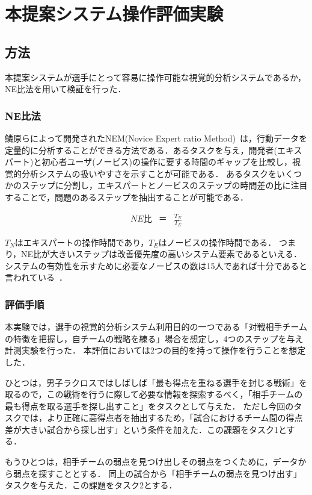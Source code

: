 \documentclass[sotsuron]{kuee}
\begin{document}
	\section{本提案システム操作評価実験}
		\subsection{方法}
			本提案システムが選手にとって容易に操作可能な視覚的分析システムであるか，NE比法を用いて検証を行った．
				\subsubsection{NE比法}
					鱗原らによって開発されたNEM(Novice Expert ratio Method)~\cite{NEM}は，行動データを定量的に分析することができる方法である．あるタスクを与え，開発者(エキスパート)と初心者ユーザ(ノービス)の操作に要する時間のギャップを比較し，視覚的分析システムの扱いやすさを示すことが可能である．
					あるタスクをいくつかのステップに分割し，エキスパートとノービスのステップの時間差の比に注目することで，問題のあるステップを抽出することが可能である．

					\begin{eqnarray}
						NE比 & ＝ & \frac{T_N}{T_E}
					\end{eqnarray}
					
					$T_N$はエキスパートの操作時間であり，$T_E$はノービスの操作時間である．
					つまり，NE比が大きいステップは改善優先度の高いシステム要素であるといえる．
					システムの有効性を示すために必要なノービスの数は15人であれば十分であると言われている~\cite{Nielsen}．
				\subsubsection{評価手順}
					本実験では，選手の視覚的分析システム利用目的の一つである「対戦相手チームの特徴を把握し，自チームの戦略を練る」場合を想定し，4つのステップを与え計測実験を行った．
					本評価においては2つの目的を持って操作を行うことを想定した．
					
					ひとつは，男子ラクロスではしばしば「最も得点を重ねる選手を封じる戦術」を取るので，この戦術を行うに際して必要な情報を探索するべく，「相手チームの最も得点を取る選手を探し出すこと」をタスクとして与えた．
					ただし今回のタスクでは，より正確に高得点者を抽出するため，「試合におけるチーム間の得点差が大きい試合から探し出す」という条件を加えた．この課題をタスク1とする．
					
					もうひとつは，相手チームの弱点を見つけ出しその弱点をつくために，データから弱点を探すこととする．
					同上の試合から「相手チームの弱点を見つけ出す」タスクを与えた．この課題をタスク2とする．
					
\end{document}
